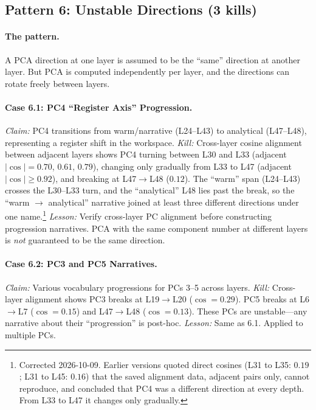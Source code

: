 \documentclass[11pt,a4paper]{article}
\begin{document}
\subsection{Pattern 6: Unstable Directions (3 kills)}

\paragraph{The pattern.} A PCA direction at one layer is assumed to be
the ``same'' direction at another layer. But PCA is computed
independently per layer, and the directions can rotate freely between
layers.

\paragraph{Case 6.1: PC4 ``Register Axis'' Progression.}
\emph{Claim:} PC4 transitions from warm/narrative (L24--L43) to
analytical (L47--L48), representing a register shift in the workspace.
\emph{Kill:} Cross-layer cosine alignment between adjacent layers shows
PC4 turning between L30 and L33 (adjacent $|\cos| = 0.70$, $0.61$,
$0.79$), changing only gradually from L33 to L47 (adjacent
$|\cos| \geq 0.92$), and breaking at L47$\to$L48 ($0.12$). The ``warm''
span (L24--L43) crosses the L30--L33 turn, and the ``analytical'' L48
lies past the break, so the ``warm $\to$ analytical'' narrative joined at
least three different directions under one name.\footnote{Corrected
2026-10-09. Earlier versions quoted direct cosines (L31 to L35: $0.19$;
L31 to L45: $0.16$) that the saved alignment data, adjacent pairs only,
cannot reproduce, and concluded that PC4 was a different direction at
every depth. From L33 to L47 it changes only gradually.}
\emph{Lesson:} Verify cross-layer PC alignment before constructing
progression narratives. PCA with the same component number at different
layers is \emph{not} guaranteed to be the same direction.

\paragraph{Case 6.2: PC3 and PC5 Narratives.}
\emph{Claim:} Various vocabulary progressions for PCs 3--5 across
layers.
\emph{Kill:} Cross-layer alignment shows PC3 breaks at
L19$\to$L20 ($\cos{=}0.29$). PC5 breaks at L6$\to$L7 ($\cos{=}0.15$)
and L47$\to$L48 ($\cos{=}0.13$). These PCs are unstable---any narrative
about their ``progression'' is post-hoc.
\emph{Lesson:} Same as 6.1. Applied to multiple PCs.
\end{document}
